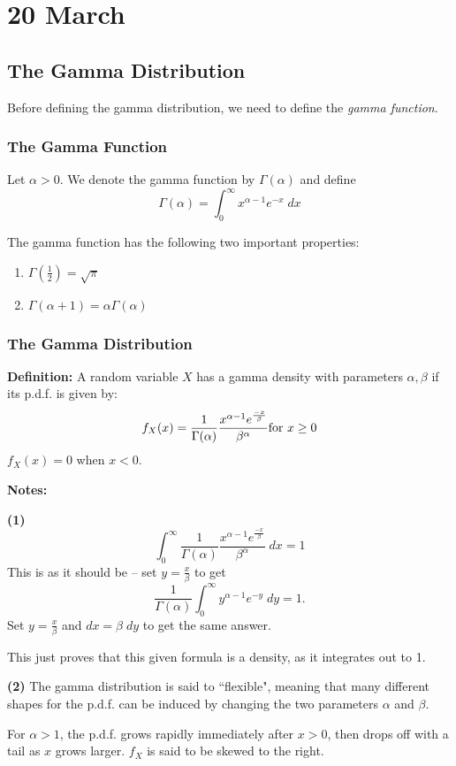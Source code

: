 \documentclass[12pt]{article}
\begin{document}
\section{20 March}
\subsection{The Gamma Distribution}
Before defining the gamma distribution, we need to define the \emph{gamma function}.

\subsubsection{The Gamma Function}
Let $\alpha> 0$. We denote the gamma function by $\Gamma (\alpha)$ and define
\[
    \Gamma(\alpha) = \int_0^{\infty} x^{\alpha - 1} e^{-x} \; dx
\]

The gamma function has the following two important properties:
\begin{enumerate}
    \item $\Gamma (\frac{1}{2}) = \sqrt{\pi}$
    \item $\Gamma(\alpha + 1) = \alpha \Gamma(\alpha)$
\end{enumerate}

\subsubsection{The Gamma Distribution}
\textbf{Definition:} A random variable $X$ has a gamma density with parameters $\alpha, \beta$ if its p.d.f. is given by:
\[
    f_X (x) = \frac{1}{\Gamma(\alpha)} \frac{x^{\alpha -1} e^{\frac{-x}{\beta}}}{\beta^{\alpha}} \textnormal{for $x \geq 0$}
\]  
$f_X (x) = 0$ when $x < 0$.

\textbf{Notes:}

\textbf{(1)} 
\[
    \int_0^{\infty} \frac{1}{\Gamma(\alpha)} \frac{x^{\alpha -1}e^{\frac{-x}{\beta}}}{\beta^{\alpha}} \; dx = 1
\]
This is as it should be -- set $y = \frac{x}{\beta}$ to get 
\[
    \frac{1}{\Gamma(\alpha)} \int_0^{\infty} y^{\alpha -1}e^{-y} \; dy = 1.
\]
Set $y=\frac{x}{\beta}$ and $dx = \beta \; dy$ to get the same answer.

This just proves that this given formula is a density, as it integrates out to 1.

\textbf{(2)}
The gamma distribution is said to ``flexible", meaning that many different shapes for the p.d.f. can be induced by changing the two parameters $\alpha$ and $\beta$.

For $\alpha > 1$, the p.d.f. grows rapidly immediately after $x > 0$, then drops off with a tail as $x$ grows larger. $f_X$ is said to be skewed to the right.
\end{document}

